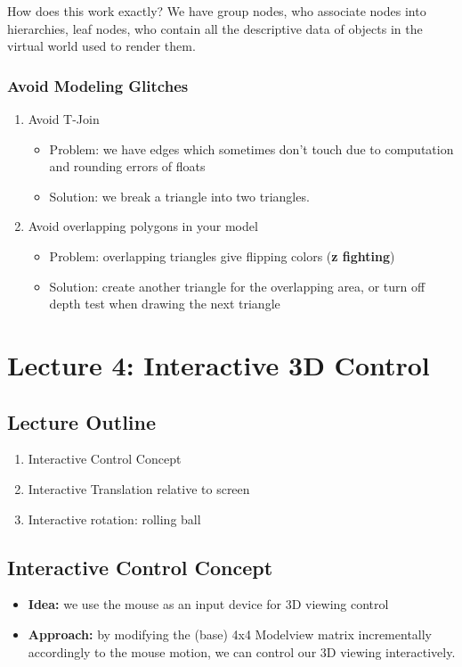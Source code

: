 \documentclass[11pt]{article}
\begin{document}
How does this work exactly? We have group nodes, who associate nodes into hierarchies, leaf nodes, who contain all the descriptive data of objects in the virtual world used to render them.

\subsubsection*{Avoid Modeling Glitches}
\begin{enumerate}
    \item Avoid T-Join \begin{itemize}
        \item Problem: we have edges which sometimes don't touch due to computation and rounding errors of floats
        \item Solution: we break a triangle into two triangles.
    \end{itemize}
    \item Avoid overlapping polygons in your model \begin{itemize}
        \item Problem: overlapping triangles give flipping colors (\textbf{z fighting})
        \item Solution: create another triangle for the overlapping area, or turn off depth test when drawing the next triangle
    \end{itemize}
    
    
\end{enumerate}
 

\section{Lecture 4: Interactive 3D Control}
\subsection*{Lecture Outline}
\begin{enumerate}
    \item Interactive Control Concept
    \item Interactive Translation relative to screen
    \item Interactive rotation: rolling ball
\end{enumerate}

\subsection{Interactive Control Concept}
\begin{itemize}
    \item \textbf{Idea:} we use the mouse as an input device for 3D viewing control
    \item \textbf{Approach:} by modifying the (base) 4x4 Modelview matrix incrementally accordingly to the mouse motion, we can control our 3D viewing interactively. 
\end{itemize}
\end{document}
